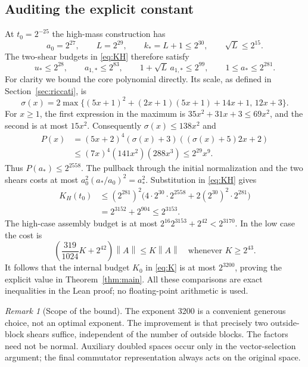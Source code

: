 \documentclass[11pt]{article}
\theoremstyle{remark}
\newtheorem{remark}[theorem]{Remark}
\newcommand{\norm}[1]{\left\lVert#1\right\rVert}
\numberwithin{equation}{section}
\begin{document}
\subsection{Auditing the explicit constant}
At $t_0=2^{-25}$ the high-mass construction has
\[
 a_0=2^{27},\qquad L=2^{29},\qquad k_*=L+1\le2^{30},\qquad \sqrt L\le2^{15}.
\]
The two-shear budgets in \eqref{eq:KH} therefore satisfy
\begin{equation}\label{eq:dyadicbudgets}
 u_*\le2^{28},\qquad a_{1,*}\le2^{83},\qquad
 1+\sqrt L\,a_{1,*}\le2^{99},\qquad 1\le a_*\le2^{281}.
\end{equation}
For clarity we bound the core polynomial directly. Its scale, as defined in
Section~\ref{sec:riccati}, is
\[
 \sigma(x)=2\max\{(5x+1)^2+(2x+1)(5x+1)+14x+1,\,12x+3\}.
\]
For $x\ge1$, the first expression in the maximum is
$35x^2+31x+3\le69x^2$, and the second is at most $15x^2$.
Consequently $\sigma(x)\le138x^2$ and
\begin{align*}
 P(x)&=(5x+2)^4(\sigma(x)+3)((\sigma(x)+5)2x+2)\\
 &\le (7x)^4(141x^2)(288x^3)
 \le2^{29}x^9.
\end{align*}
Thus $P(a_*)\le2^{2558}$. The pullback through the initial normalization
and the two shears costs at most
$a_0^2(a_*/a_0)^2=a_*^2$. Substitution in \eqref{eq:KH} gives
\begin{align*}
 K_H(t_0)
 &\le (2^{281})^2\bigl(4\cdot2^{30}\cdot2^{2558}
                 +2(2^{30})^2\cdot2^{281}\bigr)\\
 &=2^{3152}+2^{904}\le2^{3153}.
\end{align*}
The high-case assembly budget is at most
$2^{16}2^{3153}+2^{42}<2^{3170}$.
In the low case the cost is
\[
 \left(\frac{319}{1024}K+2^{42}\right)\norm A\le K\norm A
 \quad\text{whenever }K\ge2^{43}.
\]
It follows that the internal budget $K_0$ in \eqref{eq:K} is at most
$2^{3200}$, proving the explicit value in Theorem~\ref{thm:main}.
All these comparisons are exact inequalities in the Lean proof; no
floating-point arithmetic is used.

\begin{remark}[Scope of the bound]
The exponent 3200 is a convenient generous choice, not an optimal exponent.
The improvement is that precisely two outside-block shears suffice, independent
of the number of outside blocks. The factors need not be normal. Auxiliary
doubled spaces occur only in the vector-selection argument; the final
commutator representation always acts on the original space.
\end{remark}
\end{document}
